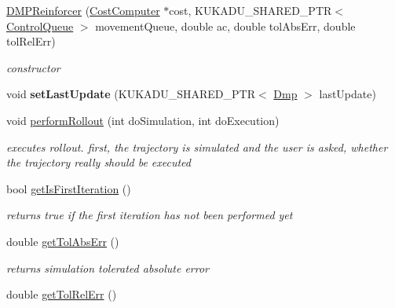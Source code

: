 \begin{DoxyCompactItemize}
\item 
\hyperlink{classkukadu_1_1DMPReinforcer_af7601db62c48a9afd1918996a1cea1a7}{D\-M\-P\-Reinforcer} (\hyperlink{classkukadu_1_1CostComputer}{Cost\-Computer} $\ast$cost, K\-U\-K\-A\-D\-U\-\_\-\-S\-H\-A\-R\-E\-D\-\_\-\-P\-T\-R$<$ \hyperlink{classkukadu_1_1ControlQueue}{Control\-Queue} $>$ movement\-Queue, double ac, double tol\-Abs\-Err, double tol\-Rel\-Err)
\begin{DoxyCompactList}\small\item\em constructor \end{DoxyCompactList}\item 
\hypertarget{classkukadu_1_1DMPReinforcer_a759bd3c0954e4287f8166a4115fd2c55}{void {\bfseries set\-Last\-Update} (K\-U\-K\-A\-D\-U\-\_\-\-S\-H\-A\-R\-E\-D\-\_\-\-P\-T\-R$<$ \hyperlink{classkukadu_1_1Dmp}{Dmp} $>$ last\-Update)}\label{classkukadu_1_1DMPReinforcer_a759bd3c0954e4287f8166a4115fd2c55}

\item 
void \hyperlink{classkukadu_1_1DMPReinforcer_ab2597f0265192981ab70cadc9fa35a05}{perform\-Rollout} (int do\-Simulation, int do\-Execution)
\begin{DoxyCompactList}\small\item\em executes rollout. first, the trajectory is simulated and the user is asked, whether the trajectory really should be executed \end{DoxyCompactList}\item 
\hypertarget{classkukadu_1_1DMPReinforcer_ab9ba3dc996de2223db6fb8d0dd79c429}{bool \hyperlink{classkukadu_1_1DMPReinforcer_ab9ba3dc996de2223db6fb8d0dd79c429}{get\-Is\-First\-Iteration} ()}\label{classkukadu_1_1DMPReinforcer_ab9ba3dc996de2223db6fb8d0dd79c429}

\begin{DoxyCompactList}\small\item\em returns true if the first iteration has not been performed yet \end{DoxyCompactList}\item 
\hypertarget{classkukadu_1_1DMPReinforcer_a9b75bfd5aefec6e93dd6ac6a130da023}{double \hyperlink{classkukadu_1_1DMPReinforcer_a9b75bfd5aefec6e93dd6ac6a130da023}{get\-Tol\-Abs\-Err} ()}\label{classkukadu_1_1DMPReinforcer_a9b75bfd5aefec6e93dd6ac6a130da023}

\begin{DoxyCompactList}\small\item\em returns simulation tolerated absolute error \end{DoxyCompactList}\item 
\hypertarget{classkukadu_1_1DMPReinforcer_a377d0dc8df73872a2d4c10e8247b0862}{double \hyperlink{classkukadu_1_1DMPReinforcer_a377d0dc8df73872a2d4c10e8247b0862}{get\-Tol\-Rel\-Err} ()}\label{classkukadu_1_1DMPReinforcer_a377d0dc8df73872a2d4c10e8247b0862}


\end{DoxyCompactItemize}
